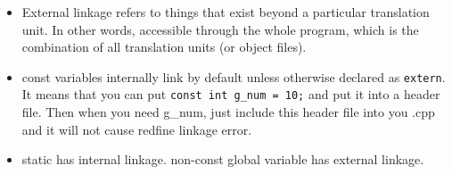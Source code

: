 \documentclass[a4paper,12pt,twoside]{book}
\begin{document}
\begin{itemize}
\item External linkage refers to things that exist beyond a particular translation unit. In other words, accessible through the whole program, which is the combination of all translation units (or object files).

\item const variables internally link by default unless otherwise declared as \texttt{extern}. It means that you can put \texttt{const int g\_num = 10;} and put it into a header file. Then when you need g\_num, just include this header file into you .cpp and it will not cause redfine linkage error.

\item static has internal linkage. non-const global variable has external linkage.

\end{itemize}
\end{document}
